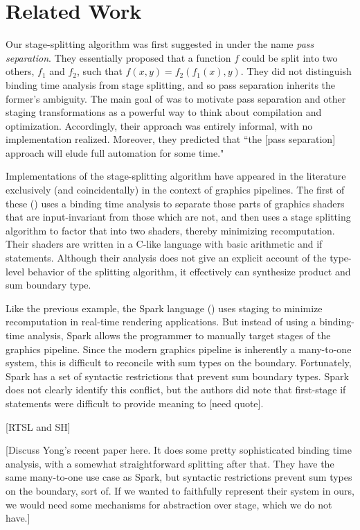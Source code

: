 \documentclass{sigplanconf}
\begin{document}
\section{Related Work}

Our stage-splitting algorithm was first suggested in \cite{jorring86} under the name {\em pass separation}.  They essentially proposed that a function $f$ could be split into two others, $f_1$ and $f_2$, such that $f(x,y)=f_2(f_1(x),y)$.  They did not distinguish binding time analysis from stage splitting, and so pass separation inherits the former's ambiguity.  The main goal of \cite{jorring86} was to motivate pass separation and other staging transformations as a powerful way to think about compilation and optimization.  Accordingly, their approach was entirely informal, with no implementation realized.  Moreover, they predicted that ``the [pass separation] approach will elude full automation for some time."  

Implementations of the stage-splitting algorithm have appeared in the literature exclusively (and coincidentally) in the context of graphics pipelines.  The first of these (\cite{knoblock96}) uses a binding time analysis to separate those parts of graphics shaders that are input-invariant from those which are not, and then uses a stage splitting algorithm to factor that into two shaders, thereby minimizing recomputation.  Their shaders are written in a C-like language with basic arithmetic and if statements.  Although their analysis does not give an explicit account of the type-level behavior of the splitting algorithm, it effectively can synthesize product and sum boundary type.  

Like the previous example, the Spark language (\cite{sparkThesis}) uses staging to minimize recomputation in real-time rendering applications.  But instead of using a binding-time analysis, Spark allows the programmer to manually target stages of the graphics pipeline.  Since the modern graphics pipeline is inherently a many-to-one system, this is difficult to reconcile with sum types on the boundary.  Fortunately, Spark has a set of syntactic restrictions that prevent sum boundary types.  Spark does not clearly identify this conflict, but the authors did note that first-stage if statements were difficult to provide meaning to [need quote].

[RTSL and SH]

[Discuss Yong's recent paper here.  It does some pretty sophisticated binding time analysis, with a somewhat straightforward splitting after that.  They have the same many-to-one use case as Spark, but syntactic restrictions prevent sum types on the boundary, sort of.  If we wanted to faithfully represent their system in ours, we would need some mechanisms for abstraction over stage, which we do not have.]
\end{document}
